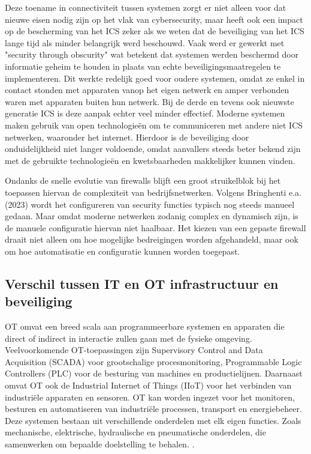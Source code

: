 Deze toename in connectiviteit tussen systemen zorgt er niet alleen voor dat nieuwe eisen nodig zijn op het vlak van cybersecurity, maar heeft ook een impact op de bescherming van het ICS zeker als we weten dat de beveiliging van het ICS lange tijd als minder belangrijk werd beschouwd. Vaak werd er gewerkt met "security through obscurity" wat betekent dat systemen werden beschermd door informatie geheim te houden in plaats van echte beveiligingsmaatregelen te implementeren. Dit werkte redelijk goed voor oudere systemen, omdat ze enkel in contact stonden met apparaten vanop het eigen netwerk en amper verbonden waren met apparaten buiten hun netwerk. Bij de derde en tevens ook nieuwste generatie ICS is deze aanpak echter veel minder effectief. Moderne systemen maken gebruik van open technologieën om te communiceren met andere niet ICS netwerken, waaronder het internet. Hierdoor is de beveiliging door onduidelijkheid niet langer voldoende, omdat aanvallers steeds beter bekend zijn met de gebruikte technologieën en kwetsbaarheden makkelijker kunnen vinden. \autocite{knowles2015}

Ondanks de snelle evolutie van firewalls blijft een groot struikelblok bij het toepassen hiervan de complexiteit van bedrijfsnetwerken. Volgens Bringhenti e.a. (2023) wordt het configureren van security functies typisch nog steeds manueel gedaan. Maar omdat moderne netwerken zodanig complex en dynamisch zijn, is de manuele configuratie hiervan niet haalbaar. Het kiezen van een gepaste firewall draait niet alleen om hoe mogelijke bedreigingen worden afgehandeld, maar ook om hoe automatisatie en configuratie kunnen worden toegepast.


\subsection{Verschil tussen IT en OT infrastructuur en beveiliging}

OT omvat een breed scala aan programmeerbare systemen en apparaten die direct of indirect in interactie zullen gaan met de fysieke omgeving. Veelvoorkomende OT-toepassingen zijn Supervisory Control and Data Acquisition (SCADA) voor grootschalige procesmonitoring, Programmable Logic Controllers (PLC) voor de besturing van machines en productielijnen. Daarnaast omvat OT ook de Industrial Internet of Things (IIoT) voor het verbinden van industriële apparaten en sensoren. OT kan worden ingezet voor het monitoren, besturen en automatiseren van industriële processen, transport en energiebeheer. Deze systemen bestaan uit verschillende onderdelen met elk eigen functies. Zoals mechanische, elektrische, hydraulische en pneumatische onderdelen, die samenwerken om bepaalde doelstelling te behalen. \autocite{Stouffer2023}.

